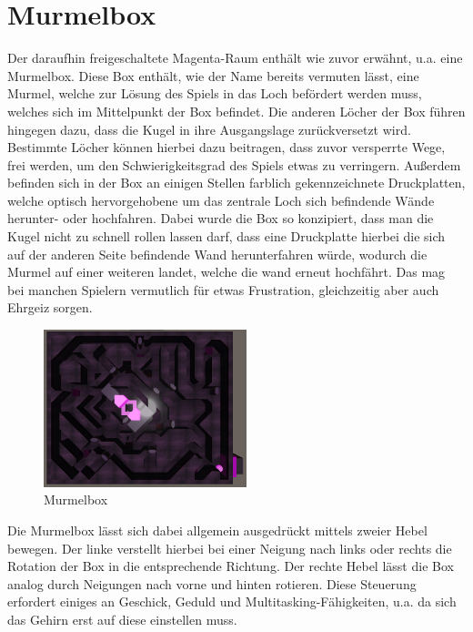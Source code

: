 \section{Murmelbox}
Der daraufhin freigeschaltete Magenta-Raum enthält wie zuvor erwähnt, u.a. eine Murmelbox. Diese Box enthält, wie der Name bereits vermuten lässt, eine Murmel, welche zur Lösung des Spiels in das Loch befördert werden muss, welches sich im Mittelpunkt der Box befindet. Die anderen Löcher der Box führen hingegen dazu, dass die Kugel in ihre Ausgangslage zurückversetzt wird. Bestimmte Löcher können hierbei dazu beitragen, dass zuvor versperrte Wege, frei werden, um den Schwierigkeitsgrad des Spiels etwas zu verringern. Außerdem befinden sich in der Box an einigen Stellen farblich gekennzeichnete Druckplatten, welche optisch hervorgehobene um das zentrale Loch sich befindende Wände herunter- oder hochfahren. Dabei wurde die Box so konzipiert, dass man die Kugel nicht zu schnell rollen lassen darf, dass eine Druckplatte hierbei die sich auf der anderen Seite befindende Wand herunterfahren würde, wodurch die Murmel auf einer weiteren landet, welche die wand erneut hochfährt. Das mag bei manchen Spielern vermutlich für etwas Frustration, gleichzeitig aber auch Ehrgeiz sorgen.\\
\begin{figure}
	\vspace*{-1cm}
	\includegraphics[width=5.9cm]{Pictures/Murmelbox}
	\caption{Murmelbox}
	\vspace*{-1cm}
	\label{fig:murmelbox}
\end{figure}
Die Murmelbox lässt sich dabei allgemein ausgedrückt mittels zweier Hebel bewegen. Der linke verstellt hierbei bei einer Neigung nach links oder rechts die Rotation der Box in die entsprechende Richtung. Der rechte Hebel lässt die Box analog durch Neigungen nach vorne und hinten rotieren. Diese Steuerung erfordert einiges an Geschick, Geduld und Multitasking-Fähigkeiten, u.a. da sich das Gehirn erst auf diese einstellen muss.


